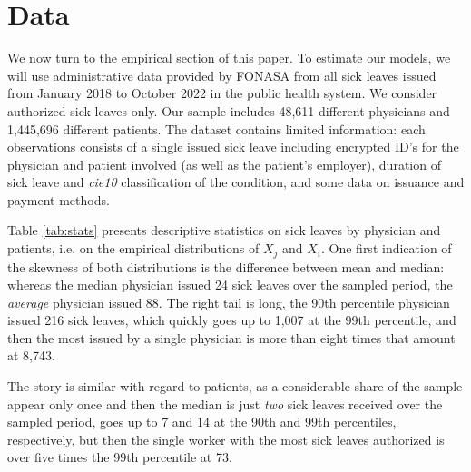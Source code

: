 \documentclass[../main.tex]{subfiles}
\begin{document}
\section{Data}

We now turn to the empirical section of this paper. To estimate our models, we will use administrative data provided by FONASA from all sick leaves issued from January 2018 to October 2022 in the public health system. We consider authorized sick leaves only. Our sample includes 48,611 different physicians and 1,445,696 different patients. The dataset contains limited information: each observations consists of a single issued sick leave including encrypted ID's for the physician and patient involved (as well as the patient's employer), duration of sick leave and \textit{cie10} classification of the condition, and some data on issuance and payment methods.

Table \ref{tab:stats} presents descriptive statistics on sick leaves by physician and patients, i.e. on the empirical distributions of $X_j$ and $X_i$. One first indication of the skewness of both distributions is the difference between mean and median: whereas the median physician issued 24 sick leaves over the sampled period, the \textit{average} physician issued 88. The right tail is long, the 90th percentile physician issued 216 sick leaves, which quickly goes up to 1,007 at the 99th percentile, and then the most issued by a single physician is more than eight times that amount at 8,743.

The story is similar with regard to patients, as a considerable share of the sample appear only once and then the median is just \textit{two} sick leaves received over the sampled period, goes up to 7 and 14 at the 90th and 99th percentiles, respectively, but then the single worker with the most sick leaves authorized is over five times the 99th percentile at 73.
\end{document}
